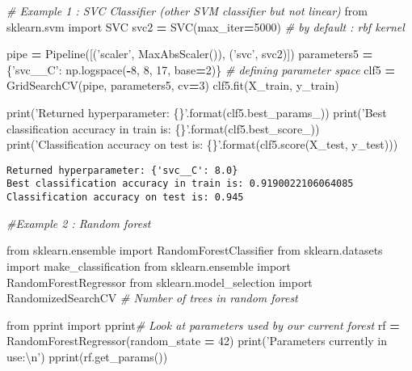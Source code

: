 \documentclass[10pt,a4paper]{article}
\newenvironment{Shaded}{\begin{snugshade}}{\end{snugshade}}
\newcommand{\BuiltInTok}[1]{#1}
\newcommand{\CharTok}[1]{\textcolor[rgb]{0.31,0.60,0.02}{#1}}
\newcommand{\CommentTok}[1]{\textcolor[rgb]{0.56,0.35,0.01}{\textit{#1}}}
\newcommand{\DecValTok}[1]{\textcolor[rgb]{0.00,0.00,0.81}{#1}}
\newcommand{\ImportTok}[1]{#1}
\newcommand{\NormalTok}[1]{#1}
\newcommand{\OperatorTok}[1]{\textcolor[rgb]{0.81,0.36,0.00}{\textbf{#1}}}
\newcommand{\SpecialCharTok}[1]{\textcolor[rgb]{0.00,0.00,0.00}{#1}}
\newcommand{\StringTok}[1]{\textcolor[rgb]{0.31,0.60,0.02}{#1}}
\theoremstyle{break}
\begin{document}
\begin{Shaded}
\begin{Highlighting}[]
\CommentTok{# Example 1 : SVC Classifier (other SVM classifier but not linear)}
\ImportTok{from}\NormalTok{ sklearn.svm }\ImportTok{import}\NormalTok{ SVC}
\NormalTok{svc2 }\OperatorTok{=}\NormalTok{ SVC(max_iter}\OperatorTok{=}\DecValTok{5000}\NormalTok{) }\CommentTok{# by default : rbf kernel}

\NormalTok{pipe }\OperatorTok{=}\NormalTok{ Pipeline([(}\StringTok{'scaler'}\NormalTok{, MaxAbsScaler()), (}\StringTok{'svc'}\NormalTok{, svc2)])}
\NormalTok{parameters5 }\OperatorTok{=}\NormalTok{ \{}\StringTok{'svc__C'}\NormalTok{: np.logspace(}\OperatorTok{-}\DecValTok{8}\NormalTok{, }\DecValTok{8}\NormalTok{, }\DecValTok{17}\NormalTok{, base}\OperatorTok{=}\DecValTok{2}\NormalTok{)\} }\CommentTok{# defining parameter space}
\NormalTok{clf5 }\OperatorTok{=}\NormalTok{ GridSearchCV(pipe, parameters5, cv}\OperatorTok{=}\DecValTok{3}\NormalTok{)}
\NormalTok{clf5.fit(X_train, y_train)}

\BuiltInTok{print}\NormalTok{(}\StringTok{'Returned hyperparameter: }\SpecialCharTok{\{\}}\StringTok{'}\NormalTok{.}\BuiltInTok{format}\NormalTok{(clf5.best_params_))}
\BuiltInTok{print}\NormalTok{(}\StringTok{'Best classification accuracy in train is: }\SpecialCharTok{\{\}}\StringTok{'}\NormalTok{.}\BuiltInTok{format}\NormalTok{(clf5.best_score_))}
\BuiltInTok{print}\NormalTok{(}\StringTok{'Classification accuracy on test is: }\SpecialCharTok{\{\}}\StringTok{'}\NormalTok{.}\BuiltInTok{format}\NormalTok{(clf5.score(X_test, y_test)))}
\end{Highlighting}
\end{Shaded}

\begin{verbatim}
Returned hyperparameter: {'svc__C': 8.0}
Best classification accuracy in train is: 0.9190022106064085
Classification accuracy on test is: 0.945
\end{verbatim}

\begin{Shaded}
\begin{Highlighting}[]
\CommentTok{#Example 2 : Random forest}

\ImportTok{from}\NormalTok{ sklearn.ensemble }\ImportTok{import}\NormalTok{ RandomForestClassifier}
\ImportTok{from}\NormalTok{ sklearn.datasets }\ImportTok{import}\NormalTok{ make_classification}
\ImportTok{from}\NormalTok{ sklearn.ensemble }\ImportTok{import}\NormalTok{ RandomForestRegressor}
\ImportTok{from}\NormalTok{ sklearn.model_selection }\ImportTok{import}\NormalTok{ RandomizedSearchCV }\CommentTok{# Number of trees in random forest}

\ImportTok{from}\NormalTok{ pprint }\ImportTok{import}\NormalTok{ pprint}\CommentTok{# Look at parameters used by our current forest}
\NormalTok{rf }\OperatorTok{=}\NormalTok{ RandomForestRegressor(random_state }\OperatorTok{=} \DecValTok{42}\NormalTok{)}
\BuiltInTok{print}\NormalTok{(}\StringTok{'Parameters currently in use:}\CharTok{\textbackslash{}n}\StringTok{'}\NormalTok{)}
\NormalTok{pprint(rf.get_params())}
\end{Highlighting}
\end{Shaded}
\end{document}
